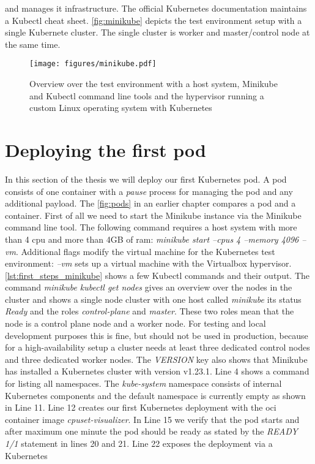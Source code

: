 \documentclass[titlepage]{report}
\begin{document}
and manages it infrastructure. The official Kubernetes documentation maintains a Kubectl cheat sheet\cite{KubectlCheatSheet}. \autoref{fig:minikube} depicts the test environment setup with a single Kubernete cluster.
The single cluster is worker and master/control node at the same time.
\begin{figure}[H]
  \centering
  \texttt{[image: figures/minikube.pdf]}
  \caption{Overview over the test environment with a host system, Minikube and Kubectl command line tools and the hypervisor running a custom Linux operating system with Kubernetes}\label{fig:minikube}
\end{figure}

\section{Deploying the first pod}
In this section of the thesis we will deploy our first Kubernetes pod. A pod consists of one container with a \emph{pause} process for managing the pod and any additional payload. The \autoref{fig:pods} in an earlier
chapter compares a pod and a container. First of all we need to start the Minikube instance via the Minikube command line tool. The following command requires a host system with more than 4 \gls{cpu} and more than 4GB
of \gls{ram}: \emph{minikube start --cpus 4 --memory 4096 --vm}. Additional flags modify the virtual machine for the Kubernetes test environment: \emph{--vm} sets up a virtual machine with the Virtualbox hypervisor.
\autoref{lst:first_steps_minikube} shows a few Kubectl commands and their output. The command \emph{minikube kubectl get nodes} gives an overview over the nodes in the cluster and shows a single node cluster
with one host called \emph{minikube} its status \emph{Ready} and the roles \emph{control-plane} and \emph{master}. These two roles mean that the node is a control plane node and a worker node. For testing and local
development purposes this is fine, but should not be used in production, because for a high-availability setup a cluster needs at least three dedicated control nodes and three dedicated worker nodes.
The \emph{VERSION} key also shows that Minikube has installed a Kubernetes cluster with version v1.23.1. Line 4 shows a command for listing all namespaces. The \emph{kube-system} namespace consists of internal
Kubernetes components and the default namespace is currently empty as shown in Line 11. Line 12 creates our first Kubernetes deployment with the \gls{oci} container image \emph{cpuset-visualizer}.
In Line 15 we verify that the pod starts and after maximum one minute the pod should be ready as stated by the \emph{READY 1/1} statement in lines 20 and 21. Line 22 exposes the deployment via a Kubernetes
\end{document}
